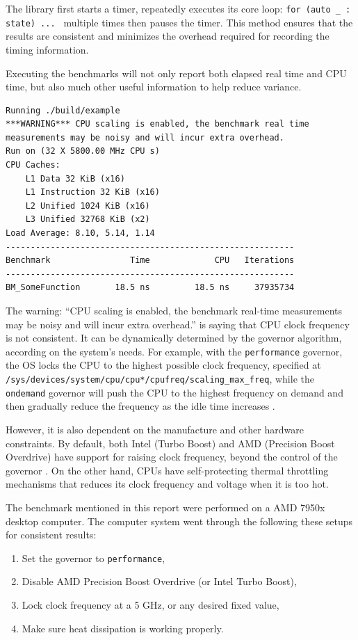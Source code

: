 \documentclass[logo,bsc,singlespacing,parskip]{infthesis}
\newenvironment{compactlist}
{ \begin{enumerate}
    \setlength{\itemsep}{0pt}
    \setlength{\parskip}{0pt}
    \setlength{\parsep}{0pt}     
}
{ \end{enumerate} }
\begin{document}
The library first starts a timer, repeatedly executes its core loop: \texttt{for
(auto \_ : state) ... } multiple times then pauses the timer. This method
ensures that the results are consistent and minimizes the overhead required for
recording the timing information. 

Executing the benchmarks will not only report both elapsed real time and CPU
time, but also much other useful information to help reduce variance. 
\begin{verbatim}
Running ./build/example
***WARNING*** CPU scaling is enabled, the benchmark real time 
measurements may be noisy and will incur extra overhead.
Run on (32 X 5800.00 MHz CPU s)
CPU Caches:
    L1 Data 32 KiB (x16)
    L1 Instruction 32 KiB (x16)
    L2 Unified 1024 KiB (x16)
    L3 Unified 32768 KiB (x2)
Load Average: 8.10, 5.14, 1.14
----------------------------------------------------------
Benchmark                Time             CPU   Iterations
----------------------------------------------------------
BM_SomeFunction       18.5 ns         18.5 ns     37935734
\end{verbatim}

The warning: ``CPU scaling is enabled, the benchmark real-time measurements may
be noisy and will incur extra overhead.'' is saying that CPU clock frequency is
not consistent. It can be dynamically determined by the governor algorithm,
according on the system's needs. For example, with the \texttt{performance}
governor, the OS locks the CPU to the highest possible clock frequency,
specified at \texttt{/sys/devices/system/cpu/cpu*/cpufreq/scaling\_max\_freq},
while the \texttt{ondemand} governor will push the CPU to the highest frequency
on demand and then gradually reduce the frequency as the idle time increases
\cite{archLinuxFreqScal}.

However, it is also dependent on the manufacture and other hardware constraints.
By default, both Intel (Turbo Boost) and AMD (Precision Boost Overdrive) have
support for raising clock frequency, beyond the control of the governor
\cite{GoogleBenchReduceVariance}. On the other hand, CPUs have self-protecting
thermal throttling mechanisms that reduces its clock frequency and voltage when
it is too hot. 

The benchmark mentioned in this report were performed on a AMD 7950x desktop
computer. The computer system went through the following these setups for
consistent results:
\begin{compactlist}
    \item Set the governor to \texttt{performance}, 
    \item Disable AMD Precision Boost Overdrive (or Intel Turbo Boost), 
    \item Lock clock frequency at a 5 GHz, or any desired fixed value,
    \item Make sure heat dissipation is working properly.
\end{compactlist}
\end{document}
